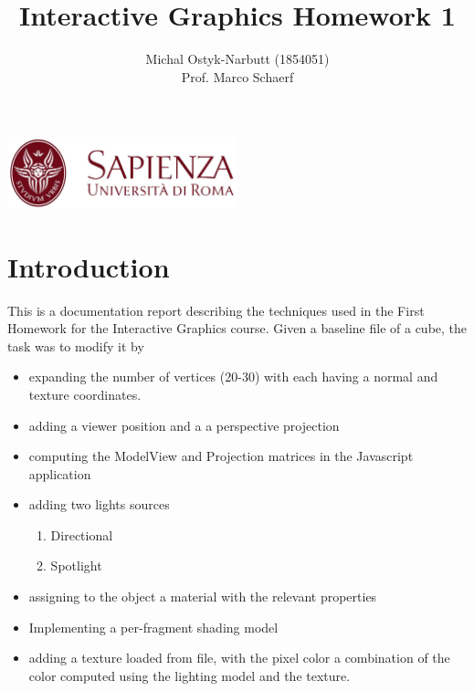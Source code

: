 \documentclass[12pt,a4paper]{article}
\begin{document}
\title{Interactive Graphics Homework 1}
\author{Michal Ostyk-Narbutt (1854051)\\ Prof. Marco Schaerf }

\maketitle


\begin{center}
\includegraphics[width=0.5\textwidth]{img/sapienza_logo.jpg}
\end{center}
\maketitle
\tableofcontents
\clearpage
\section{Introduction}


This is a documentation report describing the techniques used in the First Homework for the Interactive Graphics course. Given a baseline file of a cube, the task was to modify it by
\begin{itemize}
\item  expanding the number of vertices (20-30) with each having a normal and texture coordinates.
\item adding a viewer position and a a perspective projection
\item computing the ModelView and Projection matrices in the Javascript application
\item adding two lights sources
\begin{enumerate}
\item Directional
\item Spotlight
\end{enumerate}
\item assigning to the object a material with the relevant properties
\item  Implementing a per-fragment shading model
\item adding a texture loaded from file, with the pixel color a combination of the color
computed using the lighting model and the texture.
\end{itemize}
\end{document}
